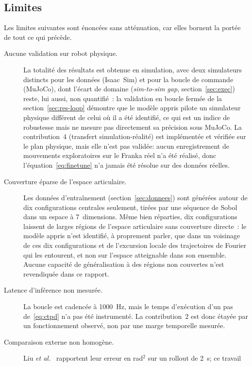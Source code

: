 \documentclass[a4paper, oneside]{article}
\begin{document}
\subsection{Limites}
\label{sec:limites}

Les limites suivantes sont énoncées sans atténuation, car elles bornent la
portée de tout ce qui précède.

\begin{description}
    \item[Aucune validation sur robot physique.] La totalité des résultats est
    obtenue en simulation, avec deux simulateurs distincts pour les données
    (Isaac~Sim) et pour la boucle de commande (MuJoCo), dont l'écart de
    domaine (\emph{sim-to-sim gap}, section~\ref{sec:exec}) reste, lui aussi,
    non quantifié~: la validation en boucle fermée de la
    section~\ref{sec:res-loop} démontre que le modèle appris pilote un
    simulateur physique différent de celui où il a été identifié, ce qui est
    un indice de robustesse mais ne mesure pas directement sa précision sous
    MuJoCo. La contribution~4 (transfert simulation-réalité) est implémentée
    et vérifiée sur le plan physique, mais elle n'est pas validée: aucun
    enregistrement de mouvements exploratoires sur le Franka réel n'a été
    réalisé, donc l'équation~\eqref{eq:finetune} n'a jamais été résolue sur
    des données réelles.
    \item[Couverture éparse de l'espace articulaire.] Les données
    d'entraînement (section~\ref{sec:donnees}) sont générées autour de dix
    configurations centrales seulement, tirées par une séquence de Sobol dans
    un espace à 7~dimensions. Même bien réparties, dix configurations laissent
    de larges régions de l'espace articulaire sans couverture directe~: le
    modèle appris n'est identifié, à proprement parler, que dans un voisinage
    de ces dix configurations et de l'excursion locale des trajectoires de
    Fourier qui les entourent, et non sur l'espace atteignable dans son
    ensemble. Aucune capacité de généralisation à des régions non couvertes
    n'est revendiquée dans ce rapport.
    \item[Latence d'inférence non mesurée.] La boucle est cadencée à \SI{1000}{Hz},
    mais le temps d'exécution d'un pas de~\eqref{eq:ctpd} n'a pas été
    instrumenté. La contribution~2 est donc étayée par un fonctionnement
    observé, non par une marge temporelle mesurée.
    \item[Comparaison externe non homogène.] Liu \emph{et al.}~\cite{liu2024}
    rapportent leur erreur en rad$^{2}$ sur un rollout de 2~s; ce travail

\end{description}
\end{document}
